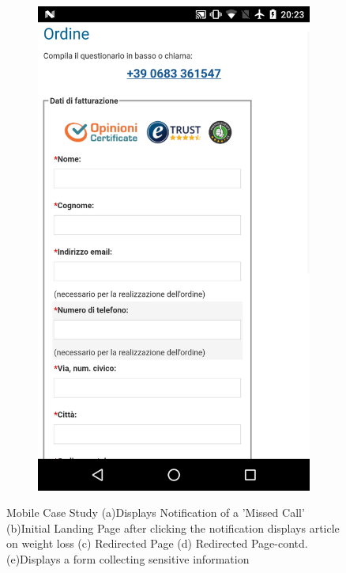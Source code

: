 \begin{figure}[h]
\begin{center}
\begin{subfigure}{.18\textwidth}
\begin{center}
        \includegraphics[scale=0.06]{figs/mobile_5}
        \caption{}
    \end{center}
    \end{subfigure}
    
    \caption{Mobile Case Study (a)Displays Notification of a 'Missed Call' (b)Initial Landing Page after clicking the notification displays article on weight loss (c) Redirected Page (d) Redirected Page-contd. (e)Displays a form collecting sensitive information }
    \label{fig:mobile}
\end{center}
\end{figure}



